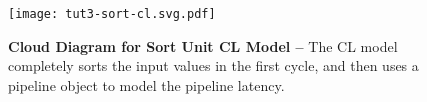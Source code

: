 
\begin{figure}[b]
  \cbxcaptionsize

  \begin{varwidth}[t]{\tw}
    \vspace{0pt}

    \texttt{[image: tut3-sort-cl.svg.pdf]}

  \end{varwidth}
  \hfill%
  \begin{minipage}[t]{0.42\tw}
    \vspace{0pt}

    \caption{\textbf{Cloud Diagram for Sort Unit CL Model --} The CL
      model completely sorts the input values in the first cycle, and
      then uses a pipeline object to model the pipeline latency.}
    \label{fig-tut3-sort-cl}

  \end{minipage}

\end{figure}

